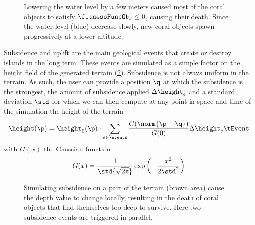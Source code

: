 \begin{figure}
    \caption{Lowering the water level by a few meters caused most of the coral objects to satisfy $\fitnessFuncObj \leq 0$, causing their death. Since the water level (blue) decrease slowly, new coral objects spawn progressively at a lower altitude.}
    \label{fig:env-obj-water-event}
\end{figure}

Subsidence and uplift are the main geological events that create or destroy islands in the long term. These events are simulated as a simple factor on the height field of the generated terrain (\cref{fig:env-obj-subsidence-event}). Subsidence is not always uniform in the terrain. As such, the user can provide a position $\q$ at which the subsidence is the strongest, the amount of subsidence applied $\Delta \height_e$ and a standard deviation $\std$ for which we can then compute at any point in space and time of the simulation the height of the terrain
\begin{align*}
    \height(\p) = \height_0(\p) \cdot \sum_{e \in \events}{\frac{G(\norm{\p - \q})}{G(0)}} \Delta \height_e \tEvent 
\end{align*}
with $G(x)$ the Gaussian function
\begin{align*}
    G(x) = {\frac {1}{\std {\sqrt {2\pi }}}} \exp \left(-\frac {x^{2}}{2 \std ^{2}}\right)
\end{align*}

\begin{figure}
    \caption{Simulating subsidence on a part of the terrain (brown area) cause the depth value to change locally, resulting in the death of coral objects that find themselves too deep to survive. Here two subsidence events are triggered in parallel. }
    \label{fig:env-obj-subsidence-event}
\end{figure}

